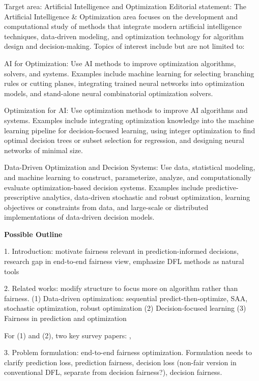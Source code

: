\documentclass[ijoc,sglanonrev]{informs4}
\begin{document}
{\color{blue} 
Target area: Artificial Intelligence and Optimization
Editorial statement: The Artificial Intelligence \& Optimization area focuses on the development and computational study of methods that integrate modern artificial intelligence techniques, data-driven modeling, and optimization technology for algorithm design and decision-making. Topics of interest include but are not limited to:

AI for Optimization: Use AI methods to improve optimization algorithms, solvers, and systems. Examples include machine learning for selecting branching rules or cutting planes, integrating trained neural networks into optimization models, and stand-alone neural combinatorial optimization solvers.

Optimization for AI: Use optimization methods to improve AI algorithms and systems. Examples include integrating optimization knowledge into the machine learning pipeline for decision-focused learning, using integer optimization to find optimal decision trees or subset selection for regression, and designing neural networks of minimal size.

Data-Driven Optimization and Decision Systems: Use data, statistical modeling, and machine learning to construct, parameterize, analyze, and computationally evaluate optimization-based decision systems. Examples include predictive-prescriptive analytics, data-driven stochastic and robust optimization, learning objectives or constraints from data, and large-scale or distributed implementations of data-driven decision models.

\textbf{Possible Outline}

1. Introduction: motivate fairness relevant in prediction-informed decisions, research gap in end-to-end fairness view, emphasize DFL methods as natural tools

2. Related works: modify structure to focus more on algorithm rather than fairness. (1) Data-driven optimization: sequential predict-then-optimize, SAA, stochastic optimization, robust optimization (2) Decision-focused learning (3) Fairness in prediction and optimization 

For (1) and (2), two key survey papers: \cite{mandi2024decision}, \cite{sadana2025survey}

3. Problem formulation: end-to-end fairness optimization.  Formulation needs to clarify prediction loss, prediction fairness, decision loss (non-fair version in conventional DFL, separate from decision fairness?), decision fairness. 

}
\end{document}

